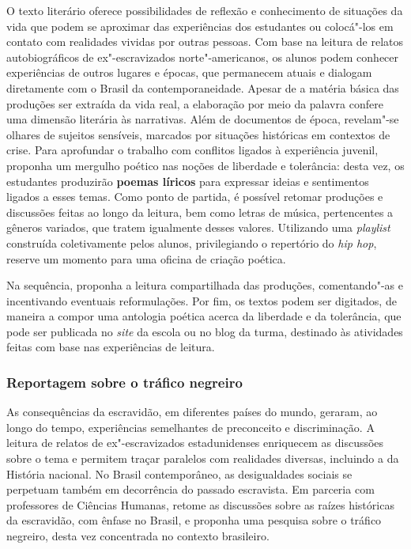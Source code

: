 \documentclass[11pt]{extarticle}
\begin{document}
  O texto literário oferece possibilidades de reflexão e conhecimento de
  situações da vida que podem se aproximar das experiências dos
  estudantes ou colocá"-los em contato com realidades vividas por outras
  pessoas. Com base na leitura de relatos autobiográficos de
  ex"-escravizados norte"-americanos, os alunos podem conhecer
  experiências de outros lugares e épocas, que permanecem atuais e
  dialogam diretamente com o Brasil da contemporaneidade. Apesar de a
  matéria básica das produções ser extraída da vida real, a elaboração
  por meio da palavra confere uma dimensão literária às narrativas. Além
  de documentos de época, revelam"-se olhares de sujeitos sensíveis,
  marcados por situações históricas em contextos de crise. Para
  aprofundar o trabalho com conflitos ligados à experiência juvenil,
  proponha um mergulho poético nas noções de liberdade e tolerância:
  desta vez, os estudantes produzirão \textbf{poemas líricos} para
  expressar ideias e sentimentos ligados a esses temas. Como ponto de
  partida, é possível retomar produções e discussões feitas ao longo da
  leitura, bem como letras de música, pertencentes a gêneros variados,
  que tratem igualmente desses valores. Utilizando uma \emph{playlist}
  construída coletivamente pelos alunos, privilegiando o repertório do
  \emph{hip hop}, reserve um momento para uma oficina de criação
  poética. 

  Na sequência, proponha a leitura compartilhada das produções,
  comentando"-as e incentivando eventuais reformulações. Por fim, os
  textos podem ser digitados, de maneira a compor uma antologia poética
  acerca da liberdade e da tolerância, que pode ser publicada no
  \emph{site} da escola ou no blog da turma, destinado às atividades
  feitas com base nas experiências de leitura.

\subsubsection{Reportagem sobre o tráfico negreiro}


  As consequências da escravidão, em diferentes países do mundo,
  geraram, ao longo do tempo, experiências semelhantes de preconceito e
  discriminação. A leitura de relatos de ex"-escravizados estadunidenses
  enriquecem as discussões sobre o tema e permitem traçar paralelos com
  realidades diversas, incluindo a da História nacional. No Brasil
  contemporâneo, as desigualdades sociais se perpetuam também em
  decorrência do passado escravista. Em parceria com professores de
  Ciências Humanas, retome as discussões sobre as raízes históricas da
  escravidão, com ênfase no Brasil, e proponha uma pesquisa sobre o
  tráfico negreiro, desta vez concentrada no contexto brasileiro. 
\end{document}
